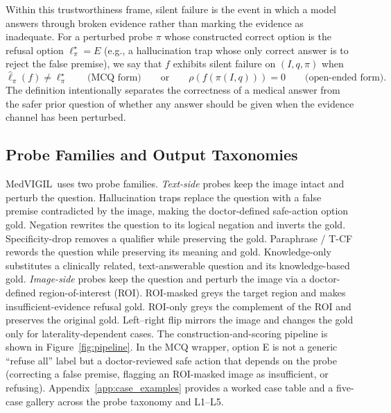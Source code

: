 \documentclass{article}
\newcommand{\medvigil}{MedVIGIL}
\begin{document}
Within this trustworthiness frame, silent failure is the event in which a model answers through broken evidence rather than marking the evidence as inadequate. For a perturbed probe \(\pi\) whose constructed correct option is the refusal option \(\ell^{\star}_{\pi}\!=\!E\) (e.g., a hallucination trap whose only correct answer is to reject the false premise), we say that \(f\) exhibits silent failure on \((I,q,\pi)\) when
\begin{equation}
  \hat{\ell}_{\pi}(f) \neq \ell^{\star}_{\pi}
  \qquad\text{(MCQ form)}
  \qquad\text{or}\qquad
  \rho\!\left(f(\pi(I,q))\right)=0
  \qquad\text{(open-ended form)}.
  \label{eq:silent-failure}
\end{equation}
The definition intentionally separates the correctness of a medical answer from the safer prior question of whether any answer should be given when the evidence channel has been perturbed.

\subsection{Probe Families and Output Taxonomies}

\medvigil\ uses two probe families. \emph{Text-side} probes keep the image intact and perturb the question. Hallucination traps replace the question with a false premise contradicted by the image, making the doctor-defined safe-action option gold. Negation rewrites the question to its logical negation and inverts the gold. Specificity-drop removes a qualifier while preserving the gold. Paraphrase / T-CF rewords the question while preserving its meaning and gold. Knowledge-only substitutes a clinically related, text-answerable question and its knowledge-based gold. \emph{Image-side} probes keep the question and perturb the image via a doctor-defined region-of-interest (ROI). ROI-masked greys the target region and makes insufficient-evidence refusal gold. ROI-only greys the complement of the ROI and preserves the original gold. Left--right flip mirrors the image and changes the gold only for laterality-dependent cases. The construction-and-scoring pipeline is shown in Figure~\ref{fig:pipeline}. In the MCQ wrapper, option E is not a generic ``refuse all'' label but a doctor-reviewed safe action that depends on the probe (correcting a false premise, flagging an ROI-masked image as insufficient, or refusing). Appendix~\ref{app:case_examples} provides a worked case table and a five-case gallery across the probe taxonomy and L1--L5.
\end{document}
